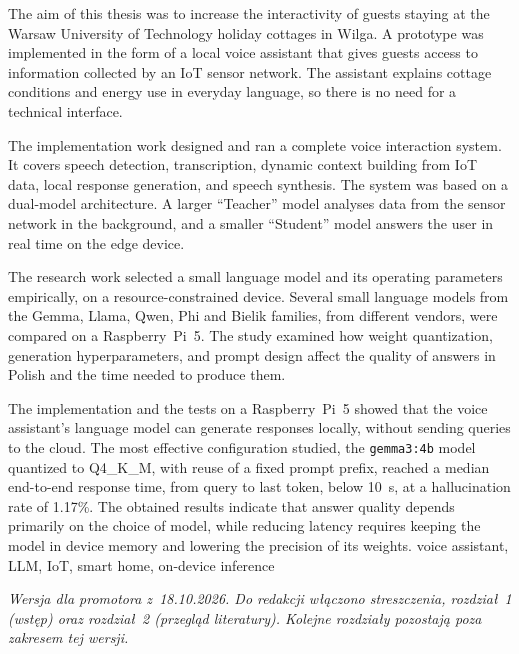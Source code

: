 \documentclass[
    a4paper,
    left=25mm,
    right=25mm,
    top=25mm,
    bottom=25mm,
    bindingoffset=5mm,
    nohyphenation=false
]{src/wut-thesis}
\begin{document}
\cleardoublepage
\abstract The aim of this thesis was to increase the interactivity of guests staying at the Warsaw University of Technology holiday cottages in Wilga. A prototype was implemented in the form of a local voice assistant that gives guests access to information collected by an IoT sensor network. The assistant explains cottage conditions and energy use in everyday language, so there is no need for a technical interface.

The implementation work designed and ran a complete voice interaction system. It covers speech detection, transcription, dynamic context building from IoT data, local response generation, and speech synthesis. The system was based on a dual-model architecture. A larger ``Teacher'' model analyses data from the sensor network in the background, and a smaller ``Student'' model answers the user in real time on the edge device.

The research work selected a small language model and its operating parameters empirically, on a resource-constrained device. Several small language models from the Gemma, Llama, Qwen, Phi and Bielik families, from different vendors, were compared on a Raspberry~Pi~5. The study examined how weight quantization, generation hyperparameters, and prompt design affect the quality of answers in Polish and the time needed to produce them.

The implementation and the tests on a Raspberry~Pi~5 showed that the voice assistant’s language model can generate responses locally, without sending queries to the cloud. The most effective configuration studied, the \texttt{gemma3:4b} model quantized to Q4\_K\_M, with reuse of a fixed prompt prefix, reached a median end-to-end response time, from query to last token, below 10~s, at a hallucination rate of 1.17\%. The obtained results indicate that answer quality depends primarily on the choice of model, while reducing latency requires keeping the model in device memory and lowering the precision of its weights.
\keywords voice assistant, LLM, IoT, smart home, on-device inference

\cleardoublepage
\pagestyle{plain}
\tableofcontents
\cleardoublepage
\pagestyle{headings}

\noindent\textit{Wersja dla promotora z~18.10.2026.
Do redakcji włączono streszczenia, rozdział~1 (wstęp) oraz rozdział~2 (przegląd literatury).
Kolejne rozdziały pozostają poza zakresem tej wersji.}



\end{document}
